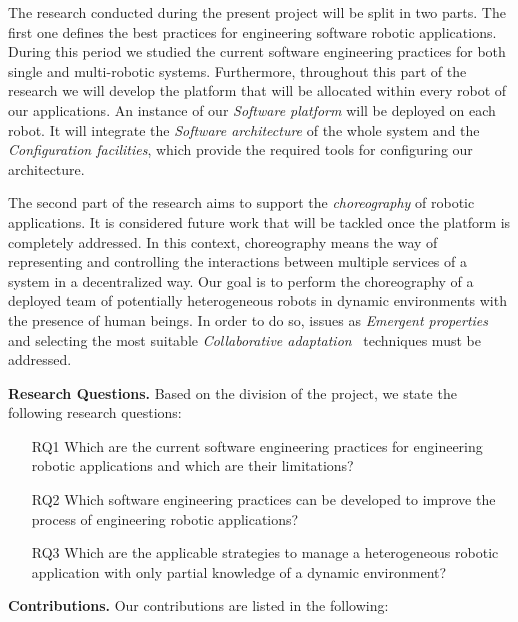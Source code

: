 The research conducted during the present project will be split in two parts.
The first one defines the best practices for engineering software robotic applications.
During this period we studied the current software engineering practices for both single and multi-robotic systems.
Furthermore, throughout this part of the research we will develop the platform that will be allocated within every robot of our applications.
An instance of our \emph{Software platform} will be deployed on each robot.
It will integrate the \emph{Software architecture} of the whole system and  the \emph{Configuration facilities}, which provide the required tools for configuring our architecture.%

The second part of the research aims to support the \emph{choreography} of robotic applications.
It is considered future work that will be tackled once the platform is completely addressed.
In this context, choreography means the way of representing and controlling the interactions between multiple services of a system in a decentralized way.
Our goal is to perform the choreography of a deployed team of potentially heterogeneous robots in dynamic environments with the presence of human beings.
In order to do so, issues as \emph{Emergent properties} ~\cite{DeAngelis2016} and selecting the most suitable \emph{Collaborative adaptation}~\cite{Yan2013} techniques must be addressed.

\textbf{Research Questions.} 
Based on the division of the project, we state the following research questions:
\begin{itemize}
\item[RQ1] Which are the current software engineering practices for engineering robotic applications and which are their limitations?
\item[RQ2] Which software engineering practices can be developed to improve the process of engineering robotic applications?
\item[RQ3] Which are the applicable strategies to manage a heterogeneous robotic application with only partial knowledge of a dynamic environment?
\end{itemize}

\textbf{Contributions.} 
Our contributions are listed in the following:

